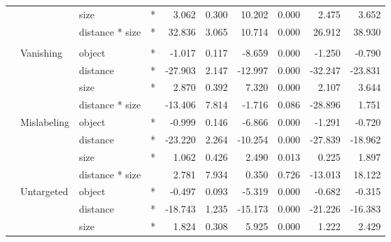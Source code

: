 \documentclass[
]{article}
\begin{document}
\begin{longtable}[t]{llllrrrrrr}
\cmidrule{3-10}\nopagebreak
\hspace{1em} &  & size & * & 3.062 & 0.300 & 10.202 & 0.000 & 2.475 & 3.652\\
\cmidrule{3-10}\nopagebreak
\hspace{1em} &  & distance * size & * & 32.836 & 3.065 & 10.714 & 0.000 & 26.912 & 38.930\\
\cmidrule{1-10}\pagebreak[0]
\addlinespace[0.3em]
\multicolumn{10}{l}{\textbf{Faster R-CNN}}\\
\hspace{1em} & Vanishing & object & * & -1.017 & 0.117 & -8.659 & 0.000 & -1.250 & -0.790\\
\cmidrule{3-10}\nopagebreak
\hspace{1em} &  & distance & * & -27.903 & 2.147 & -12.997 & 0.000 & -32.247 & -23.831\\
\cmidrule{3-10}\nopagebreak
\hspace{1em} &  & size & * & 2.870 & 0.392 & 7.320 & 0.000 & 2.107 & 3.644\\
\cmidrule{3-10}\nopagebreak
\hspace{1em} &  & distance * size &  & -13.406 & 7.814 & -1.716 & 0.086 & -28.896 & 1.751\\
\cmidrule{2-10}\nopagebreak
\hspace{1em} & Mislabeling & object & * & -0.999 & 0.146 & -6.866 & 0.000 & -1.291 & -0.720\\
\cmidrule{3-10}\nopagebreak
\hspace{1em} &  & distance & * & -23.220 & 2.264 & -10.254 & 0.000 & -27.839 & -18.962\\
\cmidrule{3-10}\nopagebreak
\hspace{1em} &  & size & * & 1.062 & 0.426 & 2.490 & 0.013 & 0.225 & 1.897\\
\cmidrule{3-10}\nopagebreak
\hspace{1em} &  & distance * size &  & 2.781 & 7.934 & 0.350 & 0.726 & -13.013 & 18.122\\
\cmidrule{2-10}\nopagebreak
\hspace{1em} & Untargeted & object & * & -0.497 & 0.093 & -5.319 & 0.000 & -0.682 & -0.315\\
\cmidrule{3-10}\nopagebreak
\hspace{1em} &  & distance & * & -18.743 & 1.235 & -15.173 & 0.000 & -21.226 & -16.383\\
\cmidrule{3-10}\nopagebreak
\hspace{1em} &  & size & * & 1.824 & 0.308 & 5.925 & 0.000 & 1.222 & 2.429\\

\end{longtable}
\end{document}
